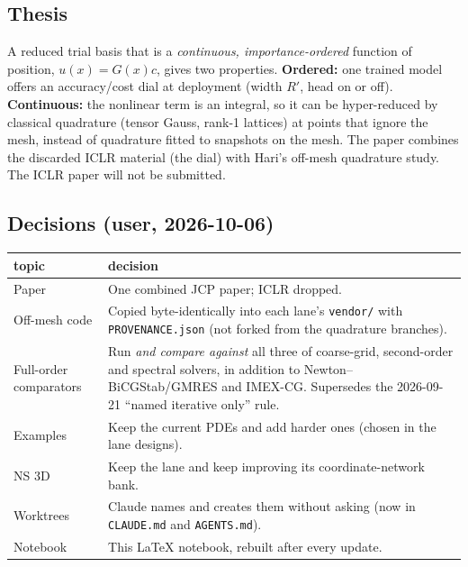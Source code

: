 
\subsection*{Thesis}
A reduced trial basis that is a \emph{continuous, importance-ordered} function of position,
$u(x)=G(x)c$, gives two properties.
\textbf{Ordered:} one trained model offers an accuracy/cost dial at deployment (width $R'$, head on or off).
\textbf{Continuous:} the nonlinear term is an integral, so it can be hyper-reduced by classical quadrature (tensor Gauss, rank-1 lattices) at points that ignore the mesh, instead of quadrature fitted to snapshots on the mesh.
The paper combines the discarded ICLR material (the dial) with Hari's off-mesh quadrature study.
The ICLR paper will not be submitted.

\subsection*{Decisions (user, 2026-10-06)}
\begin{tabularx}{\linewidth}{@{}l X@{}}
\toprule
topic & decision\\
\midrule
Paper & One combined JCP paper; ICLR dropped.\\
Off-mesh code & Copied byte-identically into each lane's \texttt{vendor/} with \texttt{PROVENANCE.json} (not forked from the quadrature branches).\\
Full-order comparators & Run \emph{and compare against} all three of coarse-grid, second-order and spectral solvers, in addition to Newton--BiCGStab/GMRES and IMEX-CG. Supersedes the 2026-09-21 ``named iterative only'' rule.\\
Examples & Keep the current PDEs and add harder ones (chosen in the lane designs).\\
NS 3D & Keep the lane and keep improving its coordinate-network bank.\\
Worktrees & Claude names and creates them without asking (now in \texttt{CLAUDE.md} and \texttt{AGENTS.md}).\\
Notebook & This LaTeX notebook, rebuilt after every update.\\
\bottomrule
\end{tabularx}

